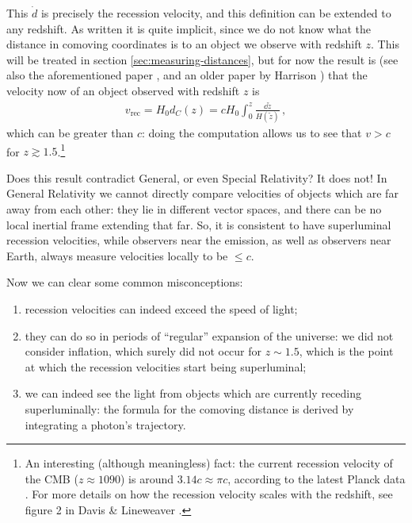 \documentclass[main.tex]{subfiles}
\begin{document}
This \(\dot{d}\) is precisely the recession velocity, and this definition can be extended to any redshift. As written it is quite implicit, since we do not know what the distance in comoving coordinates is to an object we observe with redshift \(z\). This will be treated in section \ref{sec:measuring-distances}, but for now the result is (see also the aforementioned paper \cite[eq. 1]{davisExpandingConfusionCommon2004}, and an older paper by Harrison \cite[eq. 13]{harrisonRedshiftdistanceVelocitydistanceLaws1993}) that the velocity now of an object observed with redshift \(z\) is
%
\begin{align}
v _{\text{rec}} = H_0 d_C(z) = c H_0  \int_{0}^{z} \frac{ \dd{\widetilde{z}}}{H(\widetilde{z})}
\,,
\end{align}
%
which can be greater than \(c\): doing the computation allows us to see that \(v>c\) for \(z \gtrsim 1.5\).\footnote{An interesting (although meaningless) fact: the current recession velocity of the CMB (\(z \approx 1090\)) is around \(\num{3.14} c \approx \pi c\), according to the latest Planck data \cite[]{PlanckCollaboration:2016XIII}. For more details on how the recession velocity scales with the redshift, see figure 2 in Davis \& Lineweaver \cite[]{davisExpandingConfusionCommon2004}.} 

Does this result contradict General, or even Special Relativity? 
It does not!
In General Relativity we cannot directly compare velocities of objects which are far away from each other: they lie in different vector spaces, and there can be no local inertial frame extending that far.
So, it is consistent to have superluminal recession velocities, while observers near the emission, as well as observers near Earth, always measure velocities locally to be \(\leq c\). 

Now we can clear some common misconceptions: 
\begin{enumerate}
  \item recession velocities can indeed exceed the speed of light;
  \item they can do so in periods of ``regular'' expansion of the universe: we did not consider inflation, which surely did not occur for \(z \sim 1.5\), which is the point at which the recession velocities start being superluminal;
  \item we can indeed see the light from objects which are currently receding superluminally: the formula for the comoving distance is derived by integrating a photon's trajectory. 
\end{enumerate}
\end{document}
